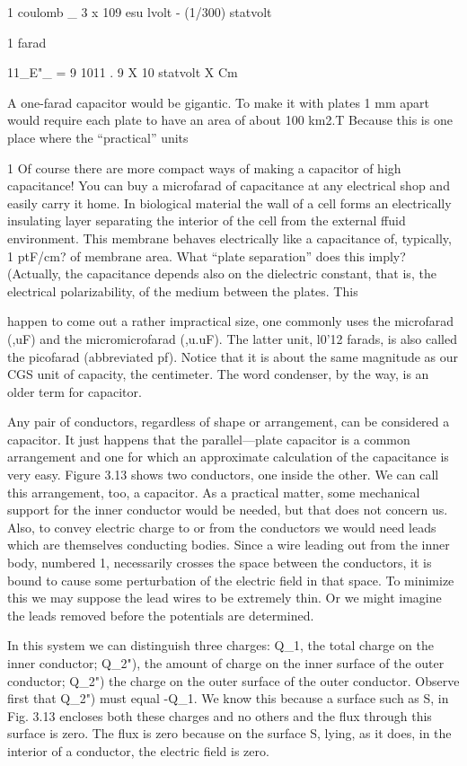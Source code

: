 1 coulomb _ 3 x 109 esu
lvolt - (1/300) statvolt

1 farad

11_E"_ = 9 1011 .
9 X 10 statvolt X Cm

A one-farad capacitor would be gigantic. To make it with plates
1 mm apart would require each plate to have an area of about
100 km2.T Because this is one place where the ``practical'' units

1 Of course there are more compact ways of making a capacitor of high capacitance!
You can buy a microfarad of capacitance at any electrical shop and easily carry it home.
In biological material the wall of a cell forms an electrically insulating layer separating
the interior of the cell from the external ffuid environment. This membrane behaves
electrically like a capacitance of, typically, 1 ptF/cm? of membrane area. What ``plate
separation'' does this imply? (Actually, the capacitance depends also on the dielectric
constant, that is, the electrical polarizability, of the medium between the plates. This

happen to come out a rather impractical size, one commonly uses
the microfarad (,uF) and the micromicrofarad (,u.uF). The latter unit,
l0'12 farads, is also called the picofarad (abbreviated pf). Notice
that it is about the same magnitude as our CGS unit of capacity, the
centimeter. The word condenser, by the way, is an older term for
capacitor.

Any pair of conductors, regardless of shape or arrangement, can
be considered a capacitor. It just happens that the parallel---plate
capacitor is a common arrangement and one for which an approximate
calculation of the capacitance is very easy. Figure 3.13 shows
two conductors, one inside the other. We can call this arrangement,
too, a capacitor. As a practical matter, some mechanical support
for the inner conductor would be needed, but that does not concern
us. Also, to convey electric charge to or from the conductors we
would need leads which are themselves conducting bodies. Since
a wire leading out from the inner body, numbered 1, necessarily
crosses the space between the conductors, it is bound to cause some
perturbation of the electric field in that space. To minimize this we
may suppose the lead wires to be extremely thin. Or we might
imagine the leads removed before the potentials are determined.

In this system we can distinguish three charges: Q_1, the total
charge on the inner conductor; Q_2"), the amount of charge on the
inner surface of the outer conductor; Q_2") the charge on the outer
surface of the outer conductor. Observe first that Q_2") must equal
-Q_1. We know this because a surface such as S, in Fig. 3.13 encloses
both these charges and no others and the flux through this
surface is zero. The flux is zero because on the surface S, lying, as
it does, in the interior of a conductor, the electric field is zero.

